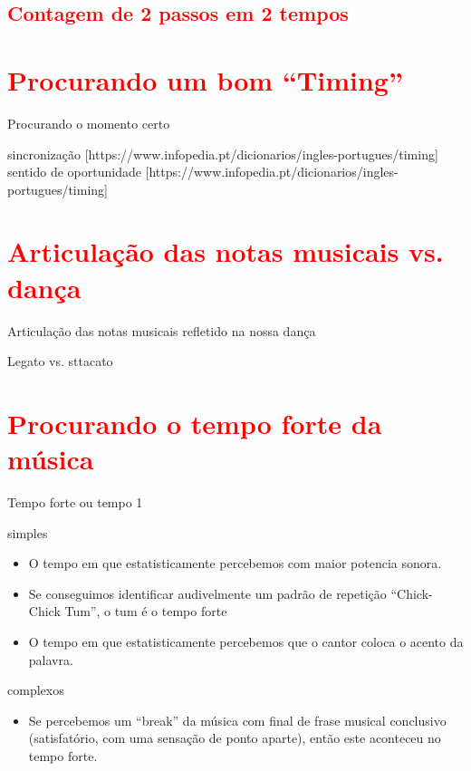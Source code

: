 \subsection{\textcolor{red}{Contagem de 2 passos em 2 tempos}}


\section{\textcolor{red}{Procurando um bom ``Timing''}}
Procurando o momento certo

 sincronização [https://www.infopedia.pt/dicionarios/ingles-portugues/timing]
 sentido de oportunidade [https://www.infopedia.pt/dicionarios/ingles-portugues/timing]
\section{\textcolor{red}{Articulação das notas musicais vs. dança}}
Articulação das notas musicais refletido na nossa dança

Legato vs. sttacato

\section{\textcolor{red}{Procurando o tempo forte da música}}
Tempo forte ou tempo 1

simples
\begin{itemize}
\item O tempo em que estatisticamente percebemos com maior potencia sonora. 
\item Se conseguimos identificar audivelmente um padrão de repetição ``Chick-Chick Tum'', o tum é o tempo forte
\item O tempo em que estatisticamente percebemos que o cantor  coloca o acento da palavra. 
\end{itemize}

complexos 
\begin{itemize}
\item Se percebemos um ``break'' da música com final de frase musical conclusivo 
(satisfatório, com uma sensação de ponto aparte), então este aconteceu no tempo forte.
\end{itemize}

